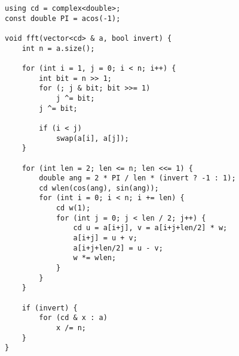\documentclass{article}
\begin{document}
\begin{lstlisting}
using cd = complex<double>;
const double PI = acos(-1);

void fft(vector<cd> & a, bool invert) {
    int n = a.size();

    for (int i = 1, j = 0; i < n; i++) {
        int bit = n >> 1;
        for (; j & bit; bit >>= 1)
            j ^= bit;
        j ^= bit;

        if (i < j)
            swap(a[i], a[j]);
    }

    for (int len = 2; len <= n; len <<= 1) {
        double ang = 2 * PI / len * (invert ? -1 : 1);
        cd wlen(cos(ang), sin(ang));
        for (int i = 0; i < n; i += len) {
            cd w(1);
            for (int j = 0; j < len / 2; j++) {
                cd u = a[i+j], v = a[i+j+len/2] * w;
                a[i+j] = u + v;
                a[i+j+len/2] = u - v;
                w *= wlen;
            }
        }
    }

    if (invert) {
        for (cd & x : a)
            x /= n;
    }
}
\end{lstlisting}
\end{document}
